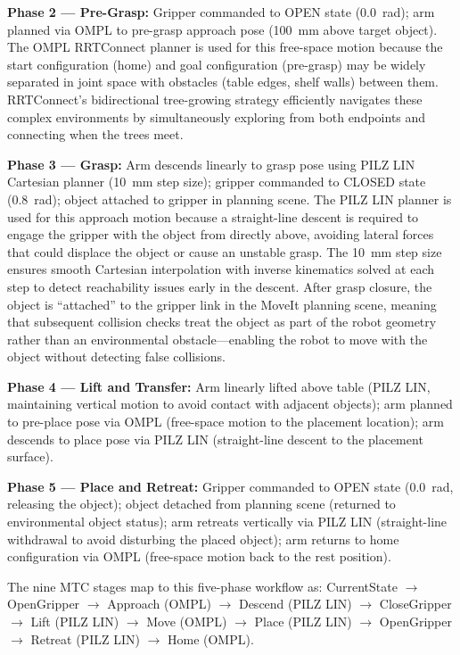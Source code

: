 \documentclass[12pt,a4paper,oneside]{report}
\begin{document}
\textbf{Phase 2 --- Pre-Grasp:} Gripper commanded to OPEN state (0.0~rad); arm planned via OMPL to pre-grasp approach pose (100~mm above target object). The OMPL RRTConnect planner is used for this free-space motion because the start configuration (home) and goal configuration (pre-grasp) may be widely separated in joint space with obstacles (table edges, shelf walls) between them. RRTConnect's bidirectional tree-growing strategy efficiently navigates these complex environments by simultaneously exploring from both endpoints and connecting when the trees meet.

\textbf{Phase 3 --- Grasp:} Arm descends linearly to grasp pose using PILZ LIN Cartesian planner (10~mm step size); gripper commanded to CLOSED state (0.8~rad); object attached to gripper in planning scene. The PILZ LIN planner is used for this approach motion because a straight-line descent is required to engage the gripper with the object from directly above, avoiding lateral forces that could displace the object or cause an unstable grasp. The 10~mm step size ensures smooth Cartesian interpolation with inverse kinematics solved at each step to detect reachability issues early in the descent. After grasp closure, the object is ``attached'' to the gripper link in the MoveIt planning scene, meaning that subsequent collision checks treat the object as part of the robot geometry rather than an environmental obstacle---enabling the robot to move with the object without detecting false collisions.

\textbf{Phase 4 --- Lift and Transfer:} Arm linearly lifted above table (PILZ LIN, maintaining vertical motion to avoid contact with adjacent objects); arm planned to pre-place pose via OMPL (free-space motion to the placement location); arm descends to place pose via PILZ LIN (straight-line descent to the placement surface).

\textbf{Phase 5 --- Place and Retreat:} Gripper commanded to OPEN state (0.0~rad, releasing the object); object detached from planning scene (returned to environmental object status); arm retreats vertically via PILZ LIN (straight-line withdrawal to avoid disturbing the placed object); arm returns to home configuration via OMPL (free-space motion back to the rest position).

The nine MTC stages map to this five-phase workflow as: CurrentState $\rightarrow$ OpenGripper $\rightarrow$ Approach (OMPL) $\rightarrow$ Descend (PILZ LIN) $\rightarrow$ CloseGripper $\rightarrow$ Lift (PILZ LIN) $\rightarrow$ Move (OMPL) $\rightarrow$ Place (PILZ LIN) $\rightarrow$ OpenGripper $\rightarrow$ Retreat (PILZ LIN) $\rightarrow$ Home (OMPL).
\end{document}
